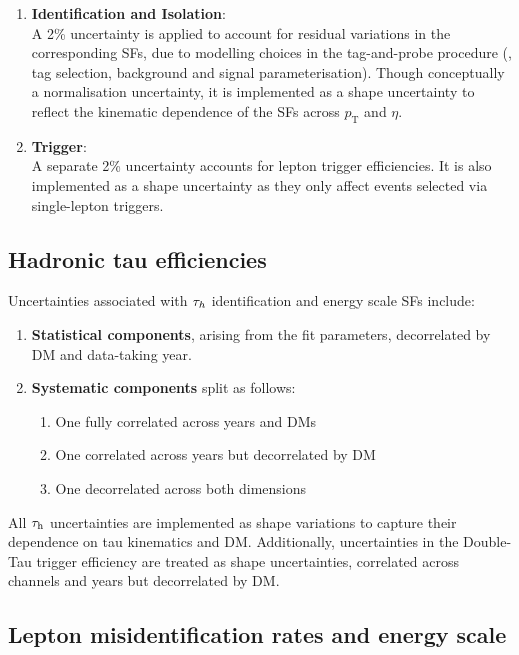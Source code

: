 \begin{enumerate}[label=(\roman*)]
\item \textbf{Identification and Isolation}: \\
A 2\% uncertainty is applied to account for residual variations in the corresponding SFs, due to modelling choices in the tag-and-probe procedure (\eg, tag selection, background and signal parameterisation). Though conceptually a normalisation uncertainty, it is implemented as a shape uncertainty to reflect the kinematic dependence of the SFs across $p_{\mathrm{T}}$ and $\eta$.

\item \textbf{Trigger}: \\
A separate 2\% uncertainty accounts for lepton trigger efficiencies. It is also implemented as a shape uncertainty as they only affect events selected via single-lepton triggers.

\end{enumerate}

\subsection{Hadronic tau efficiencies}

Uncertainties associated with $\tau_h$ identification and energy scale SFs include:

\begin{enumerate}[label=(\roman*)]
\item \textbf{Statistical components}, arising from the fit parameters, decorrelated by DM and data-taking year.

\item \textbf{Systematic components} split as follows:
\begin{enumerate}
    \item One fully correlated across years and DMs
    \item One correlated across years but decorrelated by DM
    \item One decorrelated across both dimensions
\end{enumerate}
\end{enumerate}

All $\tau_\mathrm{h}$ uncertainties are implemented as shape variations to capture their dependence on tau kinematics and DM. Additionally, uncertainties in the Double-Tau trigger efficiency are treated as shape uncertainties, correlated across channels and years but decorrelated by DM.

\subsection{Lepton misidentification rates and energy scale}

